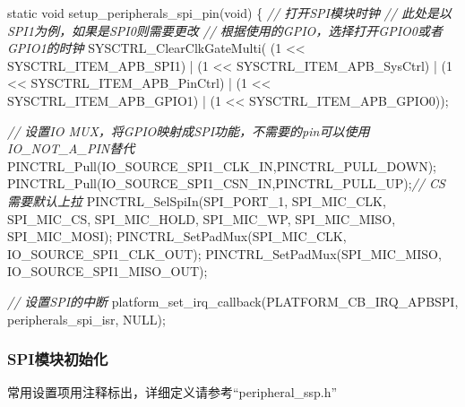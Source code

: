 \documentclass[
  12pt,
]{book}
\newenvironment{Shaded}{\begin{snugshade}}{\end{snugshade}}
\newcommand{\CommentTok}[1]{\textcolor[rgb]{0.56,0.35,0.01}{\textit{#1}}}
\newcommand{\DataTypeTok}[1]{\textcolor[rgb]{0.13,0.29,0.53}{#1}}
\newcommand{\DecValTok}[1]{\textcolor[rgb]{0.00,0.00,0.81}{#1}}
\newcommand{\NormalTok}[1]{#1}
\begin{document}
\begin{Shaded}
\begin{Highlighting}[]
\DataTypeTok{static} \DataTypeTok{void}\NormalTok{ setup_peripherals_spi_pin(}\DataTypeTok{void}\NormalTok{)}
\NormalTok{\{}
    \CommentTok{// 打开SPI模块时钟}
    \CommentTok{// 此处是以SPI1为例，如果是SPI0则需要更改}
    \CommentTok{// 根据使用的GPIO，选择打开GPIO0或者GPIO1的时钟}
\NormalTok{    SYSCTRL_ClearClkGateMulti(    (}\DecValTok{1}\NormalTok{ << SYSCTRL_ITEM_APB_SPI1)}
\NormalTok{                                | (}\DecValTok{1}\NormalTok{ << SYSCTRL_ITEM_APB_SysCtrl)}
\NormalTok{                                | (}\DecValTok{1}\NormalTok{ << SYSCTRL_ITEM_APB_PinCtrl)}
\NormalTok{                                | (}\DecValTok{1}\NormalTok{ << SYSCTRL_ITEM_APB_GPIO1)}
\NormalTok{                                | (}\DecValTok{1}\NormalTok{ << SYSCTRL_ITEM_APB_GPIO0));}

    \CommentTok{// 设置IO MUX，将GPIO映射成SPI功能，不需要的pin可以使用IO_NOT_A_PIN替代}
\NormalTok{    PINCTRL_Pull(IO_SOURCE_SPI1_CLK_IN,PINCTRL_PULL_DOWN);}
\NormalTok{    PINCTRL_Pull(IO_SOURCE_SPI1_CSN_IN,PINCTRL_PULL_UP);}\CommentTok{// CS 需要默认上拉}
\NormalTok{    PINCTRL_SelSpiIn(SPI_PORT_1, SPI_MIC_CLK, SPI_MIC_CS, SPI_MIC_HOLD, SPI_MIC_WP, SPI_MIC_MISO, SPI_MIC_MOSI);}
\NormalTok{    PINCTRL_SetPadMux(SPI_MIC_CLK, IO_SOURCE_SPI1_CLK_OUT);}
\NormalTok{    PINCTRL_SetPadMux(SPI_MIC_MISO, IO_SOURCE_SPI1_MISO_OUT);}
    
    \CommentTok{// 设置SPI的中断}
\NormalTok{    platform_set_irq_callback(PLATFORM_CB_IRQ_APBSPI, peripherals_spi_isr, NULL);}
\end{Highlighting}
\end{Shaded}

\hypertarget{spiux6a21ux5757ux521dux59cbux5316-1}{%
\subsubsection{SPI模块初始化}\label{spiux6a21ux5757ux521dux59cbux5316-1}}

常用设置项用注释标出，详细定义请参考``peripheral\_ssp.h''
\end{document}
